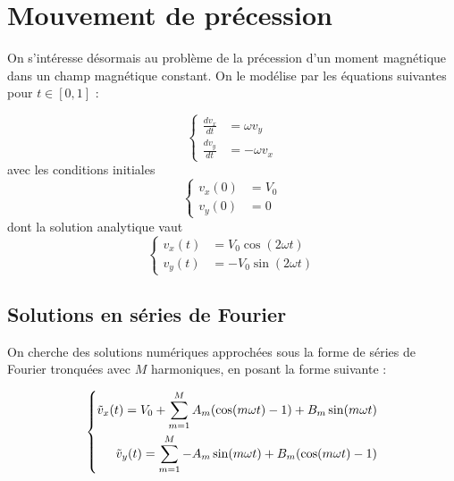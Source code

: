 \documentclass[12pt]{report}
\begin{document}
\chapter{Mouvement de précession}
\label{section_precession}
On s'intéresse désormais au problème de la précession d'un moment magnétique dans un champ magnétique constant. On le modélise par les équations suivantes pour $t\in [0,1]$ :

\begin{equation}
\left\{
    \begin{aligned}
        \frac{dv_x}{dt} &= \omega v_y \\
        \frac{dv_y}{dt} &= -\omega v_x
    \end{aligned}
\right.
\end{equation}
avec les conditions initiales
\begin{equation}
\left\{
    \begin{aligned}
        v_x(0) &= V_0 \\
        v_y(0) &= 0
    \end{aligned}
\right.
\label{eq:équations couplées}
\end{equation}
dont la solution analytique vaut
\begin{equation}
\left\{
    \begin{aligned}
        v_x(t) &=  V_0 \cos(2\omega t)\\
        v_y(t) &= -V_0 \sin(2\omega t)
    \end{aligned}
\right.
\label{eq:solution analytique couplée}
\end{equation}

\section{Solutions en séries de Fourier}
On cherche des solutions numériques approchées sous la forme de séries de Fourier tronquées avec $M$ harmoniques, en posant la forme suivante :

\begin{equation}
\left\{
    \begin{aligned}
        \Tilde{v}_x(t) = V_0 + \sum_{m=1}^{M} A_m (\cos(m\omega t)-1) + B_m \sin(m\omega t) \\
        \Tilde{v}_y(t) = \sum_{m=1}^{M} -A_m \sin(m\omega t) + B_m (\cos(m\omega t)-1)
    \end{aligned}
\right.
\label{eq:solution Fourier couplée}
\end{equation}
\end{document}
